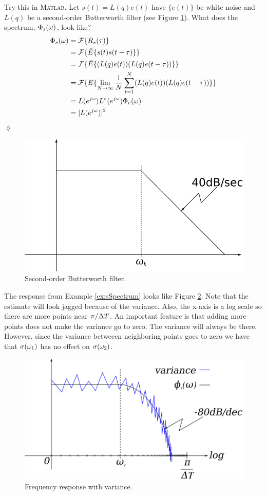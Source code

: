 \documentclass[lecture,12pt,]{pcms-l}
\begin{document}
\begin{example}
\label{ex:sSpectrum}
Try this in \textsc{Matlab}. Let $s(t)=L(q)e(t)$ have $\{e(t)\}$ be white noise and $L(q)$ be a second-order Butterworth filter (see Figure \ref{fig:06butterworthFilter}). What does the spectrum, $\Phi_s(\omega)$, look like?
\begin{align*}
\Phi_s(\omega) &= \mathcal{F}\{R_s(\tau)\} \\
&= \mathcal{F}\{\bar{E}\{s(t)s(t-\tau)\}\} \\
&= \mathcal{F}\{\bar{E}\{(L(q)e(t))(L(q)e(t-\tau))\}\} \\
&= \mathcal{F}\{E\{\lim_{N\to\infty}\frac{1}{N}\sum_{t=1}^N(L(q)e(t))(L(q)e(t-\tau))\}\} \\
&= L(e^{j\omega})L^*(e^{j\omega})\Phi_e(\omega) \\
&= |L(e^{j\omega})|^2
\end{align*}
$\lozenge$
\end{example}

\begin{figure}[ht!]
	\centering
	\includegraphics[width=.4\textwidth]{images/06butterworthFilter}
	\caption{Second-order Butterworth filter.}
	\label{fig:06butterworthFilter}
\end{figure}

The response from Example \ref{ex:sSpectrum} looks like Figure \ref{fig:06freqResp}. Note that the estimate will look jagged because of the variance. Also, the x-axis is a log scale so there are more points near $\pi/\Delta T$. An important feature is that adding more points does not make the variance go to zero. The variance will always be there. However, since the variance betweeen neighboring points goes to zero we have that $\sigma(\omega_1)$ has no effect on $\sigma(\omega_2)$.

\begin{figure}[ht!]
	\centering
	\includegraphics[width=.5\textwidth]{images/06freqResp}
	\caption{Frequency response with variance.}
	\label{fig:06freqResp}
\end{figure}
\end{document}
